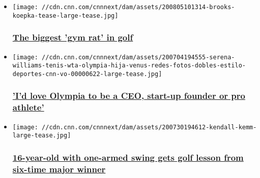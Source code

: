 \begin{itemize}
\item
  \href{/2020/08/05/golf/brooks-koepka-traditional-mould-golf-pga-championship/index.html}{}

  \texttt{[image: //cdn.cnn.com/cnnnext/dam/assets/200805101314-brooks-koepka-tease-large-tease.jpg]}

  \hypertarget{the-biggest-gym-rat-in-golf}{%
  \subsubsection{\texorpdfstring{\href{/2020/08/05/golf/brooks-koepka-traditional-mould-golf-pga-championship/index.html}{The
  biggest 'gym rat' in
  golf}}{The biggest 'gym rat' in golf}}\label{the-biggest-gym-rat-in-golf}}
\item
  \href{/2020/08/04/tennis/alexis-ohanian-serena-williams-olympia-spt-intl/index.html}{}

  \texttt{[image: //cdn.cnn.com/cnnnext/dam/assets/200704194555-serena-williams-tenis-wta-olympia-hija-venus-redes-fotos-dobles-estilo-deportes-cnn-vo-00000622-large-tease.jpg]}

  \hypertarget{id-love-olympia-to-be-a-ceo-start-up-founder-or-pro-athlete}{%
  \subsubsection{\texorpdfstring{\href{/2020/08/04/tennis/alexis-ohanian-serena-williams-olympia-spt-intl/index.html}{'I'd
  love Olympia to be a CEO, start-up founder or pro
  athlete'}}{'I'd love Olympia to be a CEO, start-up founder or pro athlete'}}\label{id-love-olympia-to-be-a-ceo-start-up-founder-or-pro-athlete}}
\item
  \href{/2020/08/01/golf/kendall-kemm-one-arm-golf-swing-nick-faldo-phil-mickelson-spt-intl/index.html}{}

  \texttt{[image: //cdn.cnn.com/cnnnext/dam/assets/200730194612-kendall-kemm-large-tease.jpg]}

  \hypertarget{16-year-old-with-one-armed-swing-gets-golf-lesson-from-six-time-major-winner-}{%
  \subsubsection{\texorpdfstring{\href{/2020/08/01/golf/kendall-kemm-one-arm-golf-swing-nick-faldo-phil-mickelson-spt-intl/index.html}{16-year-old
  with one-armed swing gets golf lesson from six-time major winner
  }}{16-year-old with one-armed swing gets golf lesson from six-time major winner }}\label{16-year-old-with-one-armed-swing-gets-golf-lesson-from-six-time-major-winner-}}
\end{itemize}

